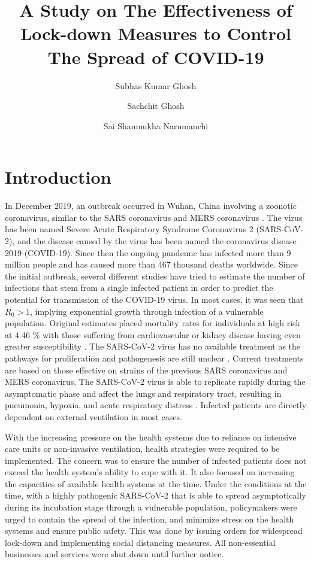 \documentclass[fleqn,10pt]{wlscirep}
\title{A Study on The Effectiveness of Lock-down Measures to Control The Spread of COVID-19}
\author[1,a]{Subhas Kumar Ghosh}
\author[2]{Sachchit Ghosh}
\author[3]{Sai Shanmukha Narumanchi}
\affil[1]{Commonwealth Bank of Australia, Sydney, New South Wales, 2000, Australia}
\affil[2]{The University of Sydney, Camperdown, NSW 2006, Australia}
\affil[3]{Department of Computer Science, Southern Illinois University, Carbondale, IL 62901, USA}
\affil[a]{subhas.ghosh@cba.com.au}
\begin{document}
\flushbottom
\maketitle
%
%
\thispagestyle{empty}
\section*{Introduction}
	\label{SEC1}
	In December 2019, an outbreak occurred in Wuhan, China involving a zoonotic coronavirus, similar to the SARS coronavirus and MERS coronavirus  \cite{taaa021}. The virus has been named Severe Acute Respiratory Syndrome Coronavirus 2 (SARS-CoV-2), and the disease caused by the virus has been named the coronavirus disease 2019 (COVID-19). Since then the ongoing pandemic has infected more than 9 million people and has caused more than 467 thousand deaths worldwide. Since the initial outbreak, several different studies have tried to estimate the number of infections \cite{GN2020} that stem from a single infected patient in order to predict the potential for transmission of the COVID-19 virus. In most cases, it was seen that $R_0 > 1$, implying exponential growth through infection of a vulnerable population. Original estimates placed mortality rates for individuals at high risk at  4.46 \% with those suffering from cardiovascular or kidney disease having even greater susceptibility \cite{BPH2020}. The SARS-CoV-2 virus has no available treatment as the pathways for proliferation and pathogenesis are still unclear \cite{RIS2020}.  Current treatments are based on those effective on strains of the previous SARS coronavirus and MERS coronavirus. The SARS-CoV-2  virus is able to replicate rapidly during the asymptomatic phase and affect the lungs and respiratory tract, resulting in pneumonia, hypoxia, and acute respiratory distress \cite{PSL2020}. Infected patients are directly dependent on external ventilation in most cases. 
	
	With the increasing pressure on the health systems due to reliance on intensive care units or non-invasive ventilation, health strategies were required to be implemented. The concern was to ensure the number of infected patients does not exceed the health system’s ability to cope with it. It also focused on increasing the capacities of available health systems at the time. Under the conditions at the time, with a highly pathogenic SARS-CoV-2 that is able to spread asymptotically during its incubation stage through a vulnerable population, policymakers were urged to contain the spread of the infection, and minimize stress on the health systems and ensure public safety. This was done by issuing orders for widespread lock-down and implementing social distancing measures. All non-essential businesses and services were shut down until further notice. 
	
\end{document}
